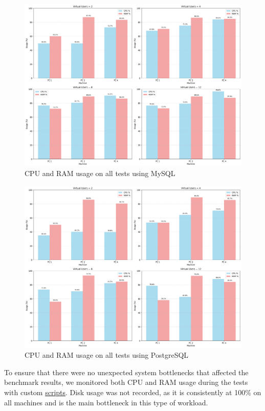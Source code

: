     \vspace{0.5cm}

\begin{figure}[H]
    \centering
    \includegraphics[width=0.87\linewidth]{Images/sys_usage_mysql_time_ranges_filtered.png}
    \caption{CPU and RAM usage on all tests using MySQL}
    \label{fig:mysql-cpu-ram}
\end{figure}

    \vspace{0.5cm}

\begin{figure}[H]
    \centering
    \includegraphics[width=0.87\linewidth]{Images/sys_usage_postgresql_time_ranges_filtered.png}
    \caption{CPU and RAM usage on all tests using PostgreSQL}
    \label{fig:pg-cpu-ram}    
\end{figure}

To ensure that there were no unexpected system bottlenecks that affected the benchmark results, we monitored both CPU and RAM usage during the tests with custom \hyperref[sec:pcstats-script]{scripts}. Disk usage was not recorded, as it is consistently at 100\% on all machines and is the main bottleneck in this type of workload.\\

